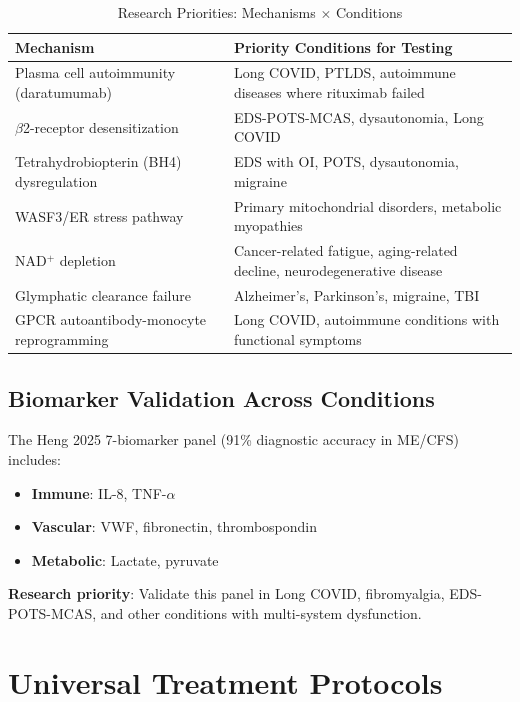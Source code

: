 \begin{table}[h]
\centering
\caption{Research Priorities: Mechanisms $\times$ Conditions}
\label{tab:translational-research-priorities}
\begin{tabular}{p{4cm}p{10cm}}
\toprule
\textbf{Mechanism} & \textbf{Priority Conditions for Testing} \\
\midrule
Plasma cell autoimmunity (daratumumab) & Long COVID, PTLDS, autoimmune diseases where rituximab failed \\
\addlinespace
$\beta$2-receptor desensitization & EDS-POTS-MCAS, dysautonomia, Long COVID \\
\addlinespace
Tetrahydrobiopterin (BH4) dysregulation & EDS with OI, POTS, dysautonomia, migraine \\
\addlinespace
WASF3/ER stress pathway & Primary mitochondrial disorders, metabolic myopathies \\
\addlinespace
NAD$^+$ depletion & Cancer-related fatigue, aging-related decline, neurodegenerative disease \\
\addlinespace
Glymphatic clearance failure & Alzheimer's, Parkinson's, migraine, TBI \\
\addlinespace
GPCR autoantibody-monocyte reprogramming & Long COVID, autoimmune conditions with functional symptoms \\
\bottomrule
\end{tabular}
\end{table}

\subsection{Biomarker Validation Across Conditions}

The Heng 2025 7-biomarker panel (91\% diagnostic accuracy in ME/CFS) includes:
\begin{itemize}
    \item \textbf{Immune}: IL-8, TNF-$\alpha$
    \item \textbf{Vascular}: VWF, fibronectin, thrombospondin
    \item \textbf{Metabolic}: Lactate, pyruvate
\end{itemize}

\textbf{Research priority}: Validate this panel in Long COVID, fibromyalgia, EDS-POTS-MCAS, and other conditions with multi-system dysfunction.

\section{Universal Treatment Protocols}
\label{sec:universal-protocols}

